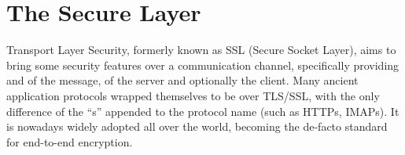 \chapter{The Secure Layer \label{chap:ssl}}

Transport Layer Security, formerly known as SSL (Secure Socket Layer), aims
to bring some security features over a communication channel, specifically
providing  and  of the message,
 of the server and optionally the client.
Many ancient application protocols wrapped themselves to be over TLS/SSL, with
the only difference of the ``s'' appended to the protocol name (such as HTTPs,
IMAPs). It is nowadays widely adopted all over the world, becoming the de-facto
standard for end-to-end  encryption.


